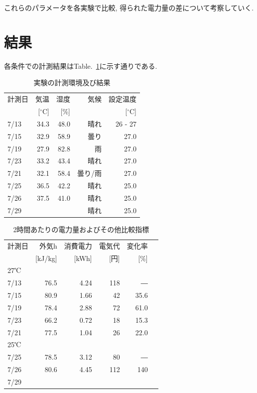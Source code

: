\documentclass[a4j,fleqn,dvipdfmx,uplatex]{jsarticle}
\newcommand{\tableref}[1]{Table.\ \ref{#1}}
\begin{document}
これらのパラメータを各実験で比較, 得られた電力量の差について考察していく. 

\section{結果}\label{sec3}
各条件での計測結果は\tableref{table:ex}に示す通りである. 

\begin{table}[htb]
  \caption{実験の計測環境及び結果}
  \label{table:ex}
  \centering
  \begin{tabular}{lrrrr}
    \small 計測日 & \small 気温 & \small 湿度 & \small 気候 & \small 設定温度 \\[-1.5mm]
     & \small [$^\circ$C] & \small [\%] & & \small [$^\circ$C] \\
    \hline \hline
    7/13 & 34.3 & 48.0 & 晴れ & 26 - 27 \\
    7/15 & 32.9 & 58.9 & 曇り & 27.0 \\
    7/19 & 27.9 & 82.8 & 雨 & 27.0 \\
    7/23 & 33.2 & 43.4 & 晴れ & 27.0 \\
    7/21 & 32.1 & 58.4 & 曇り/雨 & 27.0 \\[2.5mm]
    7/25 & 36.5 & 42.2 & 晴れ & 25.0 \\
    7/26 & 37.5 & 41.0 & 晴れ & 25.0 \\
    7/29 &  &  & 晴れ & 25.0 \\
    \hline
  \end{tabular}
\end{table}

\begin{table}[htb]
  \caption{2時間あたりの電力量およびその他比較指標}
  \label{table:ex2}
  \centering
  \begin{tabular}{lrrrrr}
    \small 計測日 &   \small 外気h & \small 消費電力 & \small 電気代 & \small 変化率\\[-1.5mm]
    & \small [kJ/kg] & \small [kWh] & \small [円] & \small [\%] \\
    \hline \hline
    27℃ \\
    \hline
    7/13 & 76.5 & 4.24 & 118 & ― \\
    7/15 & 80.9 & 1.66 & 42 & 35.6 \\
    7/19 & 78.4 & 2.88 & 72 & 61.0 \\
    7/23 & 66.2 & 0.72 & 18 & 15.3 \\
    7/21 & 77.5 & 1.04 & 26 & 22.0 \\[2mm]
    25℃ \\
    \hline
    7/25 & 78.5 & 3.12 & 80 & ― \\
    7/26 & 80.6 & 4.45 & 112  & 140 \\
    7/29 &  &  &   &  \\
    \hline
  \end{tabular}
\end{table}
\end{document}
